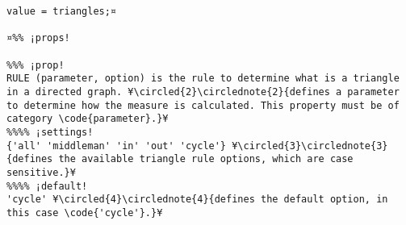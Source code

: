 \documentclass{tufte-handout}
\begin{document}
\begin{lstlisting}
value = triangles;¤

¤%% ¡props!

%%% ¡prop! 
RULE (parameter, option) is the rule to determine what is a triangle in a directed graph. ¥\circled{2}\circlednote{2}{defines a parameter to determine how the measure is calculated. This property must be of category \code{parameter}.}¥
%%%% ¡settings!
{'all' 'middleman' 'in' 'out' 'cycle'} ¥\circled{3}\circlednote{3}{defines the available triangle rule options, which are case sensitive.}¥
%%%% ¡default!
'cycle' ¥\circled{4}\circlednote{4}{defines the default option, in this case \code{'cycle'}.}¥
\end{lstlisting}

%
%
\end{document}
